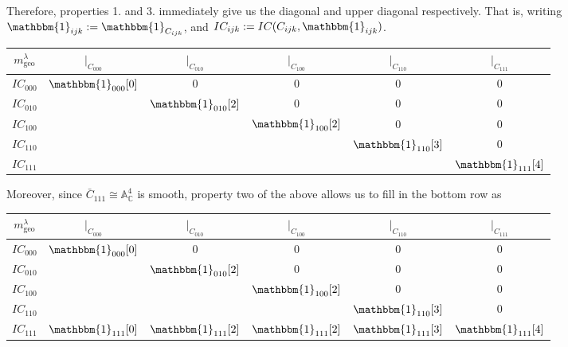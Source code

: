 \documentclass{memoir}
\newcommand{\ba}{\mathbb{A}}
\newcommand{\bc}{\mathbb{C}}
\newcommand{\tx}{\text}
\theoremstyle{definition}
\begin{document}
	Therefore, properties 1. and 3. immediately give us the diagonal and upper diagonal respectively.  
	That is, writing $\mathbbm{1}_{ijk}:=\mathbbm{1}_{C_{ijk}}$, and $IC_{ijk}:=IC(C_{ijk}, \mathbbm{1}_{ijk})$.  
		\begin{center}
		\begin{tabular}{ c | c c c c c}
			$m_{\tx{geo}}^\lambda$ & $|_{C_{000}}$ & $|_{C_{010}}$ & $|_{C_{100}}$ & $|_{C_{110}}$ & $|_{C_{111}}$ \\
			\hline 
			$IC_{000}$ & $\mathbbm{1}_{000}[0]$ & 0 & 0 & 0 & 0\\
			$IC_{010}$ &  & $\mathbbm{1}_{010}[2]$ & 0 & 0 & 0 \\
			$IC_{100}$ &  &  & $\mathbbm{1}_{100}[2]$ & 0 & 0 \\
			$IC_{110}$ &  &  &  & $\mathbbm{1}_{110}[3]$ & 0 \\
			$IC_{111}$ &  &  &   &   & $\mathbbm{1}_{111}[4]$ \\
		\end{tabular}
	\end{center}
	
	Moreover, since $\bar{C}_{111}\cong\ba_{\bc}^4$ is smooth, property two of the above allows us to fill in the bottom row as
	\begin{center}
		\begin{tabular}{ c | c c c c c}
			$m_{\tx{geo}}^\lambda$ & $|_{C_{000}}$ & $|_{C_{010}}$ & $|_{C_{100}}$ & $|_{C_{110}}$ & $|_{C_{111}}$ \\
			\hline 
			$IC_{000}$ & $\mathbbm{1}_{000}[0]$ & 0 & 0 & 0 & 0\\
			$IC_{010}$ &  & $\mathbbm{1}_{010}[2]$ & 0 & 0 & 0 \\
			$IC_{100}$ &  &  & $\mathbbm{1}_{100}[2]$ & 0 & 0 \\
			$IC_{110}$ &  &  &  & $\mathbbm{1}_{110}[3]$ & 0 \\
			$IC_{111}$ & $\mathbbm{1}_{111}[0]$ & $\mathbbm{1}_{111}[2]$ & $\mathbbm{1}_{111}[2]$ & $\mathbbm{1}_{111}[3]$ & $\mathbbm{1}_{111}[4]$ \\
		\end{tabular}
	\end{center}
	
\end{document}
